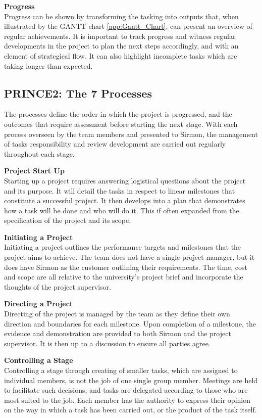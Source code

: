 \documentclass [12pt]{article}
\begin{document}
\textbf{Progress}\\
Progress can be shown by transforming the tasking into outputs that, when illustrated by the GANTT chart \ref{app:Gantt_Chart}, can present an overview of regular achievements. It is important to track progress and witness regular developments in the project to plan the next steps accordingly, and with an element of strategical flow. It can also highlight incomplete tasks which are taking longer than expected.

\subsection{PRINCE2: The 7 Processes}\label{sec:7_processes}
The processes define the order in which the project is progressed, and the outcomes that require assessment before starting the next stage. With each process overseen by the team members and presented to Sirmon, the management of tasks responsibility and review development are carried out regularly throughout each stage.

\textbf{Project Start Up}\\
Starting up a project requires answering logistical questions about the project and its purpose. It will detail the tasks in respect to linear milestones that constitute a successful project. It then develops into a plan that demonstrates how a task will be done and who will do it. This if often expanded from the specification of the project and its scope.

\textbf{Initiating a Project}\\
Initiating a project outlines the performance targets and milestones that the project aims to achieve. The team does not have a single project manager, but it does have Sirmon as the customer outlining their requirements. The time, cost and scope are all relative to the university’s project brief and incorporate the thoughts of the project supervisor.

\textbf{Directing a Project}\\
Directing of the project is managed by the team as they define their own direction and boundaries for each milestone. Upon completion of a milestone, the evidence and demonstration are provided to both Sirmon and the project supervisor. It is then up to a discussion to ensure all parties agree.

\textbf{Controlling a Stage}\\
Controlling a stage through creating of smaller tasks, which are assigned to individual members, is not the job of one single group member. Meetings are held to facilitate such decisions, and tasks are delegated according to those who are most suited to the job. Each member has the authority to express their opinion on the way in which a task has been carried out, or the product of the task itself.
\end{document}
